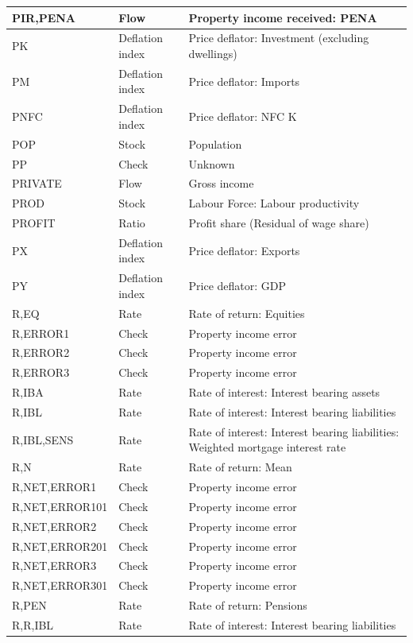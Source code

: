 \documentclass[
]{book}
\begin{document}
\begin{tabular}[t]{l|l|l}
\hline
PIR,PENA & Flow & Property income received: PENA\\
\hline
PK & Deflation index & Price deflator: Investment (excluding dwellings)\\
\hline
PM & Deflation index & Price deflator: Imports\\
\hline
PNFC & Deflation index & Price deflator: NFC K\\
\hline
POP & Stock & Population\\
\hline
PP & Check & Unknown\\
\hline
PRIVATE & Flow & Gross income\\
\hline
PROD & Stock & Labour Force: Labour productivity\\
\hline
PROFIT & Ratio & Profit share (Residual of wage share)\\
\hline
PX & Deflation index & Price deflator: Exports\\
\hline
PY & Deflation index & Price deflator: GDP\\
\hline
R,EQ & Rate & Rate of return: Equities\\
\hline
R,ERROR1 & Check & Property income error\\
\hline
R,ERROR2 & Check & Property income error\\
\hline
R,ERROR3 & Check & Property income error\\
\hline
R,IBA & Rate & Rate of interest: Interest bearing assets\\
\hline
R,IBL & Rate & Rate of interest: Interest bearing liabilities\\
\hline
R,IBL,SENS & Rate & Rate of interest: Interest bearing liabilities: Weighted mortgage interest rate\\
\hline
R,N & Rate & Rate of return: Mean\\
\hline
R,NET,ERROR1 & Check & Property income error\\
\hline
R,NET,ERROR101 & Check & Property income error\\
\hline
R,NET,ERROR2 & Check & Property income error\\
\hline
R,NET,ERROR201 & Check & Property income error\\
\hline
R,NET,ERROR3 & Check & Property income error\\
\hline
R,NET,ERROR301 & Check & Property income error\\
\hline
R,PEN & Rate & Rate of return: Pensions\\
\hline
R,R,IBL & Rate & Rate of interest: Interest bearing liabilities\\

\end{tabular}
\end{document}
